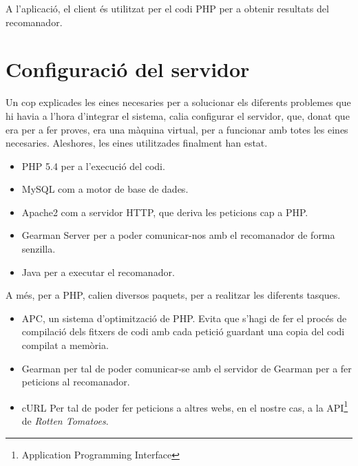 A l'aplicació, el client és utilitzat per el codi PHP per a obtenir resultats del recomanador.

\section{Configuració del servidor}

Un cop explicades les eines necesaries per a solucionar els diferents problemes que hi havia a l'hora d'integrar el sistema, calia configurar el servidor, que, donat que era per a fer proves, era una màquina virtual, per a funcionar amb totes les eines necesaries. Aleshores, les eines utilitzades finalment han estat.

\begin{itemize}
	\item{PHP 5.4} per a l'execució del codi.
	\item{MySQL} com a motor de base de dades.
	\item{Apache2} com a servidor HTTP, que deriva les peticions cap a PHP.
	\item{Gearman Server} per a poder comunicar-nos amb el recomanador de forma senzilla.
	\item{Java} per a executar el recomanador.
\end{itemize}

A més, per a PHP, calien diversos paquets, per a realitzar les diferents tasques.

\begin{itemize}
	\item{APC}, un sistema d'optimització de PHP. Evita que s'hagi de fer el procés de compilació dels fitxers de codi amb cada petició guardant una copia del codi compilat a memòria.
	\item{Gearman} per tal de poder comunicar-se amb el servidor de Gearman per a fer peticions al recomanador.
	\item{cURL} Per tal de poder fer peticions a altres webs, en el nostre cas, a la API\footnote{Application Programming Interface} de \emph{Rotten Tomatoes}.
\end{itemize}